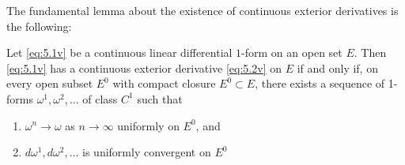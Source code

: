 \documentclass{article}
\begin{document}
The fundamental lemma about the existence of continuous exterior derivatives is the following:
\begin{lema}
Let \cref{eq:5.1v} be a continuous linear differential $1$-form on an open set $E$. Then \cref{eq:5.1v} has a continuous exterior derivative \cref{eq:5.2v}  on $E$ if and only if, on every open subset $E^{0}$ with compact closure $E^{0} \subset E$, there exists a sequence of 1-forms $\omega^{1}, \omega^{2}, \ldots$ of class $C^{1}$ such that 
\begin{enumerate}
    \item $\omega^{n} \rightarrow \omega$ as $n \rightarrow \infty$ uniformly on $E^{0}$, and
    \item  $d \omega^{1}, d \omega^{2}, \ldots$ is uniformly convergent on $E^{0}$ %
\end{enumerate}
\end{lema}
\end{document}
